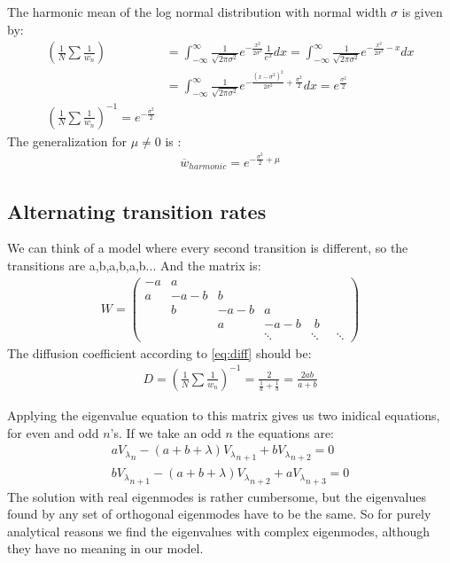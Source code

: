 \documentclass[onecolumn,fleqn]{revtex4}
\begin{document}
The harmonic mean of the log normal distribution with normal width $\sigma$ is given by:
\begin{align}
\left(\frac{1}{N}\sum\frac{1}{w_n}\right)&= \int_{-\infty}^\infty \frac{1}{\sqrt{2\pi\sigma^2}}e^{-\frac{x^2}{2\sigma^2}} \frac{1}{e^x} dx  = \int_{-\infty}^\infty \frac{1}{\sqrt{2\pi\sigma^2}}e^{-\frac{x^2}{2\sigma^2}-x} dx \\
&= \int_{-\infty}^\infty \frac{1}{\sqrt{2\pi\sigma^2}}e^{-\frac{\left(x-\sigma^2\right)^2}{2\sigma^2}+\frac{\sigma^2}{2}} dx = e^{\frac{\sigma^2}{2}}\\
\left(\frac{1}{N}\sum\frac{1}{w_n}\right)^{-1} = e^{-\frac{\sigma^2}{2}}
\end{align}
The generalization for $\mu\neq 0$ is :
\begin{align}
\overline{w}_{harmonic} = e^{-\frac{\sigma^2}{2}+\mu}
\end{align}
\subsection{Alternating transition rates}
We can think of a model where every second transition is different, so the transitions are a,b,a,b,a,b... And the matrix is:
\begin{align}
W = 
\begin{pmatrix}
-a  & a \\
a  & -a-b &  b \\
 & b & -a-b &  a \\
& & a & -a-b & \; b \\
& & & \ddots &\ddots&\;\;\ddots
\end{pmatrix}
\end{align}
The diffusion coefficient according to \ref{eq:diff} should be:
\begin{align}\label{eq:D_alter}
D = \left(\frac{1}{N}\sum\frac{1}{w_n}\right)^{-1} = \frac{2}{\frac{1}{a} + \frac{1}{b}} = \frac{2ab}{a+b}
\end{align}

Applying the eigenvalue equation to this matrix gives us two inidical equations, for even and odd $n$'s. If we take an odd $n$ the equations are:
\begin{align}
a {V_\lambda}_n - (a+b+\lambda){V_\lambda}_{n+1} + b {V_\lambda}_{n+2} =0  \\
b {V_\lambda}_{n+1} - (a+b+\lambda){V_\lambda}_{n+2} + a {V_\lambda}_{n+3} =0 
\end{align}
The solution with real eigenmodes is rather cumbersome, but the eigenvalues found by any set of orthogonal eigenmodes have to be the same. So for purely analytical reasons we find the eigenvalues with complex eigenmodes, although they have no meaning in our model.
\end{document}
